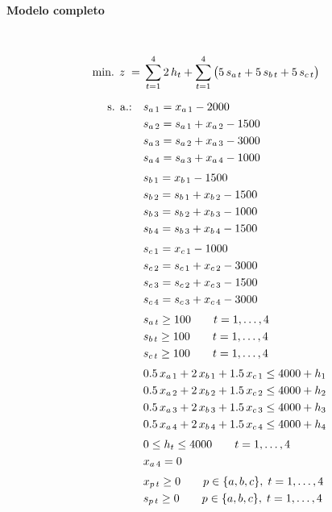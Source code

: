 \paragraph{Modelo completo}\mbox{}\\
\begin{align}
\mbox{min. } z \;=\;& \sum_{t=1}^{4} 2\,h_t + \sum_{t=1}^{4}\big(5\,s_{a\,t} + 5\,s_{b\,t} + 5\,s_{c\,t}\big) \notag\\[2mm]
\mbox{s. a.:}\quad
& s_{a\,1} = x_{a\,1} - 2000 \notag\\
& s_{a\,2} = s_{a\,1} + x_{a\,2} - 1500 \notag\\
& s_{a\,3} = s_{a\,2} + x_{a\,3} - 3000 \notag\\
& s_{a\,4} = s_{a\,3} + x_{a\,4} - 1000 \notag\\[1mm]
& s_{b\,1} = x_{b\,1} - 1500 \notag\\
& s_{b\,2} = s_{b\,1} + x_{b\,2} - 1500 \notag\\
& s_{b\,3} = s_{b\,2} + x_{b\,3} - 1000 \notag\\
& s_{b\,4} = s_{b\,3} + x_{b\,4} - 1500 \notag\\[1mm]
& s_{c\,1} = x_{c\,1} - 1000 \notag\\
& s_{c\,2} = s_{c\,1} + x_{c\,2} - 3000 \notag\\
& s_{c\,3} = s_{c\,2} + x_{c\,3} - 1500 \notag\\
& s_{c\,4} = s_{c\,3} + x_{c\,4} - 3000 \notag\\[1mm]
& s_{a\,t} \ge 100 \qquad t=1,\dots,4 \notag\\
& s_{b\,t} \ge 100 \qquad t=1,\dots,4 \notag\\
& s_{c\,t} \ge 100 \qquad t=1,\dots,4 \notag\\[1mm]
& 0.5\,x_{a\,1} + 2\,x_{b\,1} + 1.5\,x_{c\,1} \le 4000 + h_1 \notag\\
& 0.5\,x_{a\,2} + 2\,x_{b\,2} + 1.5\,x_{c\,2} \le 4000 + h_2 \notag\\
& 0.5\,x_{a\,3} + 2\,x_{b\,3} + 1.5\,x_{c\,3} \le 4000 + h_3 \notag\\
& 0.5\,x_{a\,4} + 2\,x_{b\,4} + 1.5\,x_{c\,4} \le 4000 + h_4 \notag\\[1mm]
& 0 \le h_t \le 4000 \qquad t=1,\dots,4 \notag\\
& x_{a\,4} = 0 \notag\\[1mm]
& x_{p\,t} \ge 0 \qquad p\in\{a,b,c\},\; t=1,\dots,4 \notag\\
& s_{p\,t} \ge 0 \qquad p\in\{a,b,c\},\; t=1,\dots,4 \notag
\end{align}


